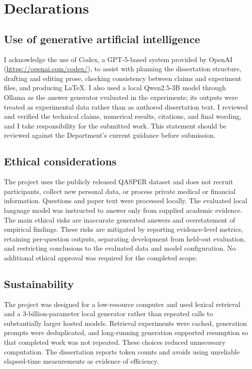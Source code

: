\chapter*{Declarations}

\section*{Use of generative artificial intelligence}

I acknowledge the use of Codex, a GPT-5-based system provided by OpenAI (\url{https://openai.com/codex/}), to assist with planning the dissertation structure, drafting and editing prose, checking consistency between claims and experiment files, and producing LaTeX. I also used a local Qwen2.5-3B model through Ollama as the answer generator evaluated in the experiments; its outputs were treated as experimental data rather than as authored dissertation text. I reviewed and verified the technical claims, numerical results, citations, and final wording, and I take responsibility for the submitted work. This statement should be reviewed against the Department's current guidance before submission.

\section*{Ethical considerations}

The project uses the publicly released QASPER dataset and does not recruit participants, collect new personal data, or process private medical or financial information. Questions and paper text were processed locally. The evaluated local language model was instructed to answer only from supplied academic evidence. The main ethical risks are inaccurate generated answers and overstatement of empirical findings. These risks are mitigated by reporting evidence-level metrics, retaining per-question outputs, separating development from held-out evaluation, and restricting conclusions to the evaluated data and model configuration. No additional ethical approval was required for the completed scope.

\section*{Sustainability}

The project was designed for a low-resource computer and used lexical retrieval and a 3-billion-parameter local generator rather than repeated calls to substantially larger hosted models. Retrieval experiments were cached, generation prompts were deduplicated, and long-running generation supported resumption so that completed work was not repeated. These choices reduced unnecessary computation. The dissertation reports token counts and avoids using unreliable elapsed-time measurements as evidence of efficiency.

